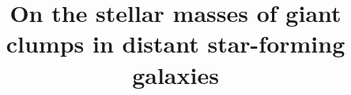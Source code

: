 \documentclass[twocolumn]{aastex61}
\begin{document}
\title{On the stellar masses of giant clumps in distant star-forming galaxies}


\end{document}
